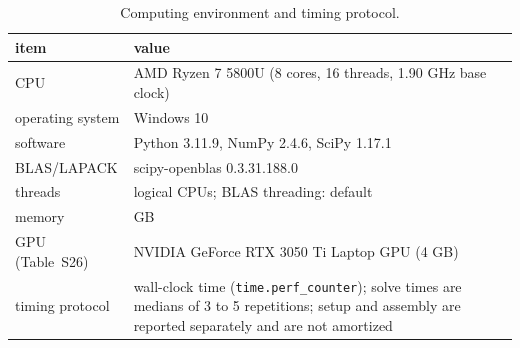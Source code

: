 \begin{table}[htbp]\centering\small
\caption{Computing environment and timing protocol.}
\begin{tabular}{>{\raggedright\arraybackslash}p{}>{\raggedright\arraybackslash}p{}}
\toprule
item & value\\
\midrule
CPU & AMD Ryzen 7 5800U (8 cores, 16 threads, 1.90 GHz base clock)\\
operating system & Windows 10\\
software & Python 3.11.9, NumPy 2.4.6, SciPy 1.17.1\\
BLAS/LAPACK & scipy-openblas 0.3.31.188.0\\
threads & 16 logical CPUs; BLAS threading: default\\
memory & 16 GB\\
GPU (Table~S26) & NVIDIA GeForce RTX 3050 Ti Laptop GPU (4 GB)\\
timing protocol & wall-clock time (\texttt{time.perf\_counter}); solve times are medians of 3 to 5 repetitions; setup and assembly are reported separately and are not amortized\\
\bottomrule
\end{tabular}
\end{table}

